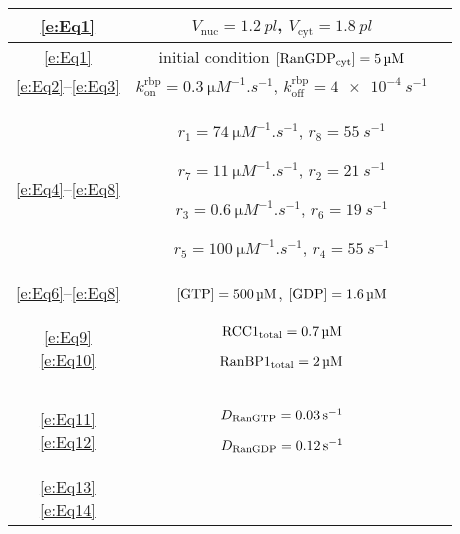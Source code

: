 \documentclass[12pt,notitlepage]{article}
\begin{document}
\begin{table}
\centering
\begin{tabular}{c|c|c}
	\hline
	\eqref{e:Eq1}
	&
	$V_\text{nuc} = \SI{1.2}{pl}$,
	\quad
	$V_\text{cyt} = \SI{1.8}{pl}$
	& 
	\cite[Table II]{GoerlichSeewaldRibbeck2003}
	\\
	\hline
	\eqref{e:Eq1}
	&
	initial condition
	$[\ce{RanGDP_{cyt}}] = \SI{5}{\micro M}$
	&
	\cite[Table II]{GoerlichSeewaldRibbeck2003}
	\\
	\hline
	\eqref{e:Eq2}--\eqref{e:Eq3}
	&
	$k_\text{on}^\text{rbp} = \SI{0.3}{\micro M^{-1}.s^{-1}}$,
	\quad
	$k_\text{off}^\text{rbp} = \SI{4e-4}{s^{-1}}$
	&
	\cite[Supp.~Table~A]{GoerlichSeewaldRibbeck2003}
	\\
	\hline
	\eqref{e:Eq4}--\eqref{e:Eq8}
	&
	\makecell{
		$r_1 = \SI{74}{\micro M^{-1} . s^{-1}}$,
		\quad
		$r_8 = \SI{55}{s^{-1}}$
		\\
		$r_7 = \SI{11}{\micro M^{-1} . s^{-1}}$,
		\quad
		$r_2 = \SI{21}{s^{-1}}$
		\\
		$r_3 = \SI{0.6}{\micro M^{-1} . s^{-1}}$,
		\quad
		$r_6 = \SI{19}{s^{-1}}$
		\\
		$r_5 = \SI{100}{\micro M^{-1} . s^{-1}}$,
		\quad
		$r_4 = \SI{55}{s^{-1}}$
	}
	&
	\makecell{
		\cite[Supp.~Table~A]{GoerlichSeewaldRibbeck2003}
		\\
		\cite[Fig.~6]{KlebePrinzWittinghoferGoody1995}
	}
	\\
	\hline
	\eqref{e:Eq6}--\eqref{e:Eq8}
	&
	$[\ce{GTP}] = \SI{500}{\micro M}$,
	\quad
	$[\ce{GDP}] = \SI{1.6}{\micro M}$
	&
	\cite[Table II]{GoerlichSeewaldRibbeck2003}
	\\
	\hline
	\makecell{
		\eqref{e:Eq9} \\ \eqref{e:Eq10}
	}
	&
	\makecell{
		$\ce{{RCC1}_{total}} = \SI{0.7}{\micro M}$
		\\
		$\ce{{RanBP1}_{total}} = \SI{2}{\micro M}$
	}
	&
	\makecell{
		\cite[Supp.~Table~B]{GoerlichSeewaldRibbeck2003}
		\\
		\cite[Fig.~4]{GoerlichSeewaldRibbeck2003}
	}
	\\
	\hline
	\makecell{
		\eqref{e:Eq11} \\ \eqref{e:Eq12}
	}
	&
	\makecell{
		$D_{\ce{RanGTP}} = \SI{0.03}{s^{-1}}$
		\\
		$D_{\ce{RanGDP}} = \SI{0.12}{s^{-1}}$
	}
	&
	\cite[Table II]{GoerlichSeewaldRibbeck2003}
	\\
	\hline
	\makecell{
		\eqref{e:Eq13} \\ \eqref{e:Eq14}
}
\end{tabular}
\end{table}
\end{document}
